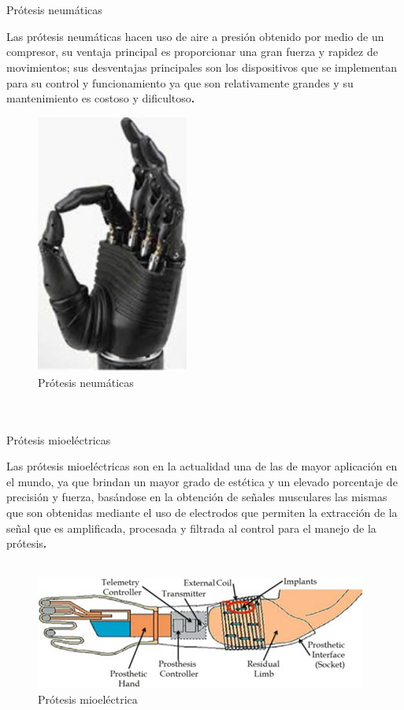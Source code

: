 \documentclass{article}
\begin{document}
\begin{description}
\begin{description}
\\
\\

{Prótesis neumáticas} \\
\item Las prótesis neumáticas hacen uso de aire a presión obtenido por medio de un compresor, su ventaja principal es proporcionar una gran fuerza y rapidez de movimientos; sus desventajas principales son los dispositivos que se implementan para su control y funcionamiento ya que son relativamente grandes y su mantenimiento es costoso y dificultoso\cite{ff2}\textbf.\\

\begin{figure} [htp]%
    \centering
    \includegraphics[width=50mm]{imagen5.jpg} %
    \caption{Prótesis neumáticas}
    \label{grafica}
\end{figure}
\\
\\

{Prótesis mioeléctricas} \\
\item Las prótesis mioeléctricas son en la actualidad una de las de mayor aplicación en el mundo, ya que brindan un mayor grado de estética y un elevado porcentaje de precisión y fuerza, basándose en la obtención de señales musculares las mismas que son obtenidas mediante el uso de electrodos que permiten la extracción de la señal que es amplificada, procesada y filtrada al control para el manejo de la prótesis\cite{ff2}\textbf.\\
\\
\begin{figure} [htp]%
    \centering
    \includegraphics[width100mm]{imagen6.jpg} %
    \caption{Prótesis mioeléctrica}
    \label{grafica}
\end{figure}


\end{description}
\end{description}
\end{document}
